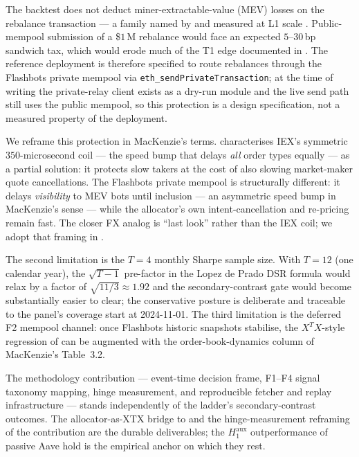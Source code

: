 The backtest does not deduct miner-extractable-value (MEV) losses
on the rebalance transaction --- a family named by
\cite{daian2020flashboys} and measured at L1 scale
\cite{heimbach2023pbs, capponi2025mev}.
Public-mempool submission of a \$$1$\,M rebalance would face an
expected $5$--$30$\,bp sandwich tax, which would erode much of the
T1 edge documented in
.  The reference deployment is therefore
specified to route rebalances through the Flashbots private mempool via
\texttt{eth\_sendPrivateTransaction}; at the time of writing the
private-relay client exists as a dry-run module and the live send path
still uses the public mempool, so this protection is a design
specification, not a measured property of the deployment.

We reframe this protection in MacKenzie's terms.
\cite[pp.\,200--203]{mackenzie2021} characterises IEX's symmetric
$350$-microsecond coil --- the speed bump that delays \emph{all}
order types equally --- as a partial solution: it protects slow
takers at the cost of also slowing market-maker quote
cancellations.  The Flashbots private mempool is structurally
different: it delays \emph{visibility} to MEV bots until
inclusion --- an asymmetric speed bump in MacKenzie's sense ---
while the allocator's own intent-cancellation and re-pricing
remain fast.  The closer FX analog is ``last look'' rather than
the IEX coil; we adopt that framing in
.

The second limitation is the $T = 4$ monthly Sharpe sample size.
With $T = 12$ (one calendar year), the $\sqrt{T-1}$ pre-factor
in the Lopez de Prado DSR formula
\cite[Ch.\,14.7.3]{lopezdeprado2018} would relax by a factor of
$\sqrt{11/3} \approx 1.92$ and the secondary-contrast gate would
become substantially easier to clear; the conservative posture is
deliberate and traceable to the panel's coverage start at
2024-11-01.  The third limitation is the deferred F2 mempool
channel: once Flashbots historic snapshots stabilise, the
$X^{T} X$-style regression of \cite[p.\,176]{mackenzie2021} can
be augmented with the order-book-dynamics column of MacKenzie's
Table~3.2.

The methodology contribution --- event-time decision frame,
F1--F4 signal taxonomy mapping, hinge measurement, and
reproducible fetcher and replay infrastructure --- stands independently
of the ladder's secondary-contrast outcomes.  The
allocator-as-XTX bridge to \cite{mackenzie2021} and the
hinge-measurement reframing of the contribution are the durable
deliverables; the $H_{1}^{\text{aux}}$ outperformance of passive
Aave hold is the empirical anchor on which they rest.

